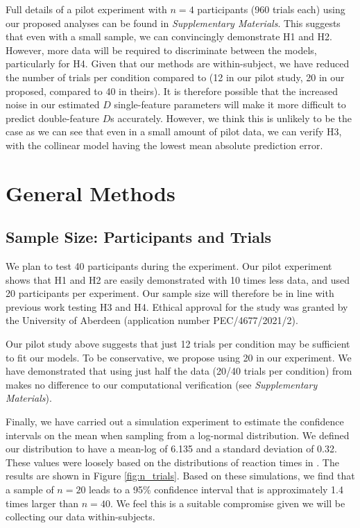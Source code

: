 \documentclass[preprint,12pt,authoryear]{elsarticle}
\begin{document}
Full details of a pilot experiment with $n=4$ participants (960 trials each) using our proposed analyses can be found in \textit{Supplementary Materials}. This suggests that even with a small sample, we can convincingly demonstrate H1 and H2. However, more data will be required to discriminate between the models, particularly for H4. Given that our methods are within-subject, we have reduced the number of trials per condition compared to \cite{buetti2019predicting} (12 in our pilot study, 20 in our proposed, compared to 40 in theirs). It is therefore possible that the increased noise in our estimated $D$ single-feature parameters will make it more difficult to predict double-feature $D$s accurately. However, we think this is unlikely to be the case as we can see that even in a small amount of pilot data, we can verify H3, with the collinear model having the lowest mean absolute prediction error.  

\section{General Methods}

\subsection{Sample Size: Participants and Trials}

We plan to test 40 participants during the experiment. Our pilot experiment shows that H1 and H2 are easily demonstrated with 10 times less data, and \cite{buetti2019predicting} used 20 participants per experiment. Our sample size will therefore be in line with previous work testing H3 and H4. 
Ethical approval for the study was granted by the University of Aberdeen (application number PEC/4677/2021/2).

Our pilot study above suggests that just 12 trials per condition may be sufficient to fit our models. To be conservative, we propose using 20 in our experiment. We have demonstrated that using just half the data (20/40 trials per condition) from \cite{buetti2019predicting} makes no difference to our computational verification (see \textit{Supplementary Materials}).

Finally, we have carried out a simulation experiment to estimate the confidence intervals on the mean when sampling from a log-normal distribution. We defined our distribution to have a mean-log of 6.135 and a standard deviation of 0.32. These values were loosely based on the distributions of reaction times in \cite{buetti2019predicting}. The results are shown in Figure \ref{fig:n_trials}. Based on these simulations, we find that a sample of $n=20$ leads to a 95\% confidence interval that is approximately 1.4 times larger than $n=40$. We feel this is a suitable compromise given we will be collecting our data within-subjects. 
\end{document}
